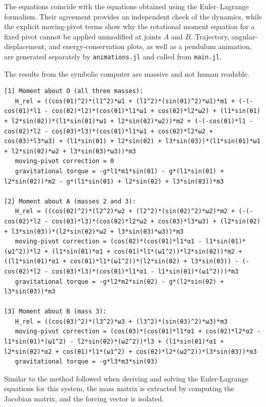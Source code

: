The equations coincide with the equations obtained using the
Euler--Lagrange formalism. Their agreement provides an independent check of
the dynamics, while the explicit moving-pivot terms show why the rotational
moment equation for a fixed pivot cannot be applied unmodified at joints $A$
and $B$. Trajectory, angular-displacement, and energy-conservation plots, as
well as a pendulum animation, are generated separately by
\texttt{animations.jl} and called from \texttt{main.jl}.

The results from the symbolic computer are massive and not human readable.

\begin{verbatim}
[1] Moment about O (all three masses):
   H_rel = ((cos(θ1)^2)*(l1^2)*ω1 + (l1^2)*(sin(θ1)^2)*ω1)*m1 + (-(-cos(θ1)*l1 - cos(θ2)*l2)*(cos(θ1)*l1*ω1 + cos(θ2)*l2*ω2) + (l1*sin(θ1) + l2*sin(θ2))*(l1*sin(θ1)*ω1 + l2*sin(θ2)*ω2))*m2 + (-(-cos(θ1)*l1 - cos(θ2)*l2 - cos(θ3)*l3)*(cos(θ1)*l1*ω1 + cos(θ2)*l2*ω2 + cos(θ3)*l3*ω3) + (l1*sin(θ1) + l2*sin(θ2) + l3*sin(θ3))*(l1*sin(θ1)*ω1 + l2*sin(θ2)*ω2 + l3*sin(θ3)*ω3))*m3
   moving-pivot correction = 0
   gravitational torque = -g*l1*m1*sin(θ1) - g*(l1*sin(θ1) + l2*sin(θ2))*m2 - g*(l1*sin(θ1) + l2*sin(θ2) + l3*sin(θ3))*m3

[2] Moment about A (masses 2 and 3):
   H_rel = ((cos(θ2)^2)*(l2^2)*ω2 + (l2^2)*(sin(θ2)^2)*ω2)*m2 + (-(-cos(θ2)*l2 - cos(θ3)*l3)*(cos(θ2)*l2*ω2 + cos(θ3)*l3*ω3) + (l2*sin(θ2) + l3*sin(θ3))*(l2*sin(θ2)*ω2 + l3*sin(θ3)*ω3))*m3
   moving-pivot correction = (cos(θ2)*(cos(θ1)*l1*α1 - l1*sin(θ1)*(ω1^2))*l2 + (l1*sin(θ1)*α1 + cos(θ1)*l1*(ω1^2))*l2*sin(θ2))*m2 + ((l1*sin(θ1)*α1 + cos(θ1)*l1*(ω1^2))*(l2*sin(θ2) + l3*sin(θ3)) - (-cos(θ2)*l2 - cos(θ3)*l3)*(cos(θ1)*l1*α1 - l1*sin(θ1)*(ω1^2)))*m3
   gravitational torque = -g*l2*m2*sin(θ2) - g*(l2*sin(θ2) + l3*sin(θ3))*m3

[3] Moment about B (mass 3):
   H_rel = ((cos(θ3)^2)*(l3^2)*ω3 + (l3^2)*(sin(θ3)^2)*ω3)*m3
   moving-pivot correction = (cos(θ3)*(cos(θ1)*l1*α1 + cos(θ2)*l2*α2 - l1*sin(θ1)*(ω1^2) - l2*sin(θ2)*(ω2^2))*l3 + (l1*sin(θ1)*α1 + l2*sin(θ2)*α2 + cos(θ1)*l1*(ω1^2) + cos(θ2)*l2*(ω2^2))*l3*sin(θ3))*m3
   gravitational torque = -g*l3*m3*sin(θ3)
\end{verbatim}

Similar to the method followed when deriving and solving the Euler-Lagrange equations for this system, the mass matrix is extracted by computing the Jacobian matrix, and the forcing vector is isolated.

